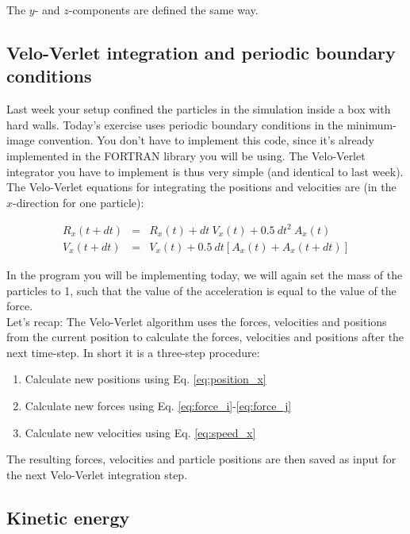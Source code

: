 \documentclass{article}
\begin{document}
The $y$- and $z$-components are defined the same way.

\subsection{Velo-Verlet integration and periodic boundary conditions}

Last week your setup confined the particles in the simulation inside a box with hard walls.
Today's exercise uses periodic boundary conditions in the minimum-image convention.
%
You don't have to implement this code, since it's already implemented in the FORTRAN library you will be using.
The Velo-Verlet integrator you have to implement is thus very simple (and identical to last week).
The Velo-Verlet equations for integrating the positions and velocities are (in the $x$-direction for one particle):

\begin{eqnarray}
    R_x(t + dt) &=& R_x(t) + dt\ V_x(t) + 0.5\ dt^2\ A_x(t) \label{eq:position_x}\\
    V_x(t + dt) &=& V_x(t) + 0.5\ dt \left[A_x(t) + A_x(t+dt)\right] \label{eq:speed_x}
\end{eqnarray}

In the program you will be implementing today, we will again set the mass of the particles to 1, such that the value of the acceleration is equal to the value of the force.\\

Let's recap: The Velo-Verlet algorithm uses the forces, velocities and positions from the current position to calculate the forces, velocities and positions after the next time-step.
In short it is a three-step procedure:

\begin{enumerate}
    \item Calculate new positions using Eq. \ref{eq:position_x}
    \item Calculate new forces using Eq. \ref{eq:force_i}-\ref{eq:force_j}
    \item Calculate new velocities using Eq. \ref{eq:speed_x}
\end{enumerate}

The resulting forces, velocities and particle positions are then saved as input for the next Velo-Verlet integration step.

\subsection{Kinetic energy}
\end{document}

